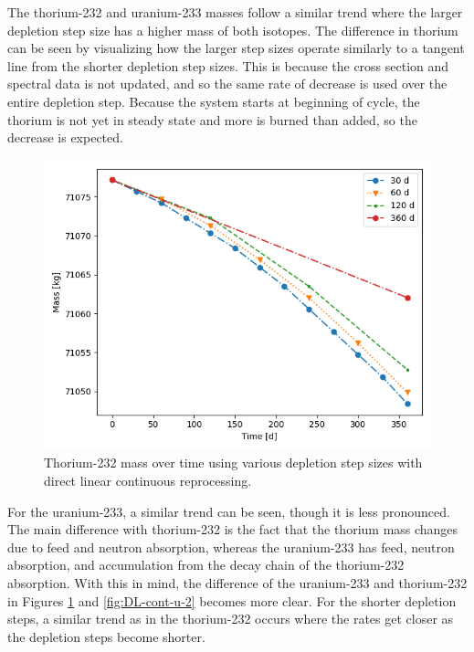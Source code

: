 The thorium-232 and uranium-233 masses follow a similar trend where the larger depletion step size has a higher mass of both isotopes. The difference in thorium can be seen by visualizing how the larger step sizes operate similarly to a tangent line from the shorter depletion step sizes. This is because the cross section and spectral data is not updated, and so the same rate of decrease is used over the entire depletion step. Because the system starts at beginning of cycle, the thorium is not yet in steady state and more is burned than added, so the decrease is expected. 

\begin{figure}[H]
  \centering
  \includegraphics[scale=0.7]{images/DL_NSTEP_Th-232_mass-large.png}
  \caption{Thorium-232 mass over time using various depletion step sizes with direct linear continuous reprocessing.}
   \label{fig:DL-cont-th-2}
\end{figure}

For the uranium-233, a similar trend can be seen, though it is less pronounced. The main difference with thorium-232 is the fact that the thorium mass changes due to feed and neutron absorption, whereas the uranium-233 has feed, neutron absorption, and accumulation from the decay chain of the thorium-232 absorption. With this in mind, the difference of the uranium-233 and thorium-232 in Figures \ref{fig:DL-cont-th-2} and \ref{fig:DL-cont-u-2} becomes more clear. For the shorter depletion steps, a similar trend as in the thorium-232 occurs where the rates get closer as the depletion steps become shorter.

